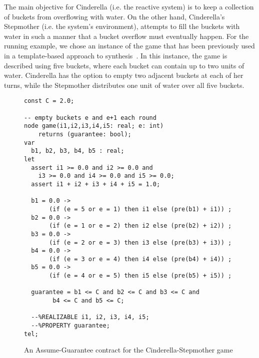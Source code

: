 The main objective for Cinderella (i.e. the reactive system) is to keep a
collection of buckets from overflowing with water. On the other hand,
Cinderella's Stepmother (i.e. the system's environment), attempts to fill the
buckets with water in such a manner that a bucket overflow must eventually
happen.
For the running example, we chose an instance of the game that has been
previously used in a template-based approach to
synthesis~\cite{beyene2014constraint}. In this instance, the game is described
using five buckets, where each bucket can contain up to two units of water.
Cinderella has the option to empty two adjacent buckets at each of her turns,
while the Stepmother distributes one unit of water over all five buckets.

\begin{figure}[!t]
\centering
 \begin{Verbatim}[fontsize=\scriptsize]
const C = 2.0;

-- empty buckets e and e+1 each round
node game(i1,i2,i3,i4,i5: real; e: int)
	returns (guarantee: bool);
var
  b1, b2, b3, b4, b5 : real;
let
  assert i1 >= 0.0 and i2 >= 0.0 and 
 	i3 >= 0.0 and i4 >= 0.0 and i5 >= 0.0;
  assert i1 + i2 + i3 + i4 + i5 = 1.0;

  b1 = 0.0 -> 
       (if (e = 5 or e = 1) then i1 else (pre(b1) + i1)) ;
  b2 = 0.0 -> 
       (if (e = 1 or e = 2) then i2 else (pre(b2) + i2)) ;
  b3 = 0.0 -> 
       (if (e = 2 or e = 3) then i3 else (pre(b3) + i3)) ;
  b4 = 0.0 -> 
       (if (e = 3 or e = 4) then i4 else (pre(b4) + i4)) ;
  b5 = 0.0 -> 
       (if (e = 4 or e = 5) then i5 else (pre(b5) + i5)) ;

  guarantee = b1 <= C and b2 <= C and b3 <= C and 
  	    b4 <= C and b5 <= C;

  --%REALIZABLE i1, i2, i3, i4, i5;
  --%PROPERTY guarantee;
tel;
 \end{Verbatim}
\caption{An Assume-Guarantee contract for the Cinderella-Stepmother game}
\label{fg:cind}
\end{figure}

